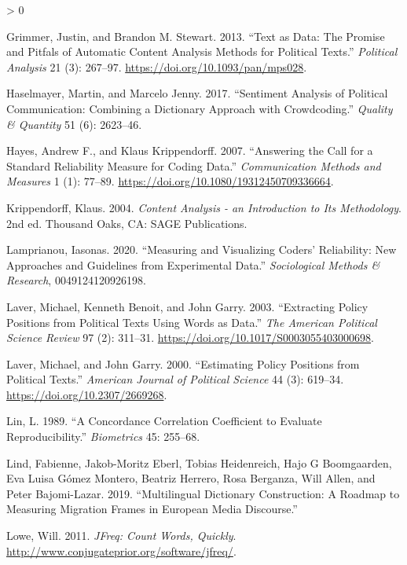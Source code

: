 \documentclass[
]{book}
\newlength{\cslhangindent}
\newenvironment{CSLReferences}[2] %
 {%
  \setlength{\parindent}{0pt}
  \ifodd #1 \everypar{\setlength{\hangindent}{\cslhangindent}}\ignorespaces\fi
  \ifnum #2 > 0
  \setlength{\parskip}{#2\baselineskip}
  \fi
 }%
 {}
\begin{document}
\begin{CSLReferences}{1}{0}
\leavevmode\hypertarget{ref-Grimmer2013a}{}%
Grimmer, Justin, and Brandon M. Stewart. 2013. {``Text as Data: The Promise and Pitfals of Automatic Content Analysis Methods for Political Texts.''} \emph{Political Analysis} 21 (3): 267--97. \url{https://doi.org/10.1093/pan/mps028}.

\leavevmode\hypertarget{ref-Haselmayer2017}{}%
Haselmayer, Martin, and Marcelo Jenny. 2017. {``Sentiment Analysis of Political Communication: Combining a Dictionary Approach with Crowdcoding.''} \emph{Quality \& Quantity} 51 (6): 2623--46.

\leavevmode\hypertarget{ref-Hayes2007a}{}%
Hayes, Andrew F., and Klaus Krippendorff. 2007. {``Answering the Call for a Standard Reliability Measure for Coding Data.''} \emph{Communication Methods and Measures} 1 (1): 77--89. \url{https://doi.org/10.1080/19312450709336664}.

\leavevmode\hypertarget{ref-Krippendorff2004a}{}%
Krippendorff, Klaus. 2004. \emph{Content Analysis - an Introduction to Its Methodology}. 2nd ed. Thousand Oaks, CA: SAGE Publications.

\leavevmode\hypertarget{ref-Lamprianou2020}{}%
Lamprianou, Iasonas. 2020. {``Measuring and Visualizing Coders' Reliability: New Approaches and Guidelines from Experimental Data.''} \emph{Sociological Methods \& Research}, 0049124120926198.

\leavevmode\hypertarget{ref-Laver2003a}{}%
Laver, Michael, Kenneth Benoit, and John Garry. 2003. {``Extracting Policy Positions from Political Texts Using Words as Data.''} \emph{The American Political Science Review} 97 (2): 311--31. \url{https://doi.org/10.1017/S0003055403000698}.

\leavevmode\hypertarget{ref-Laver2000a}{}%
Laver, Michael, and John Garry. 2000. {``Estimating Policy Positions from Political Texts.''} \emph{American Journal of Political Science} 44 (3): 619--34. \url{https://doi.org/10.2307/2669268}.

\leavevmode\hypertarget{ref-Lin1989a}{}%
Lin, L. 1989. {``A Concordance Correlation Coefficient to Evaluate Reproducibility.''} \emph{Biometrics} 45: 255--68.

\leavevmode\hypertarget{ref-Lind2019}{}%
Lind, Fabienne, Jakob-Moritz Eberl, Tobias Heidenreich, Hajo G Boomgaarden, Eva Luisa Gómez Montero, Beatriz Herrero, Rosa Berganza, Will Allen, and Peter Bajomi-Lazar. 2019. {``Multilingual Dictionary Construction: A Roadmap to Measuring Migration Frames in European Media Discourse.''}

\leavevmode\hypertarget{ref-Lowe2011b}{}%
Lowe, Will. 2011. \emph{JFreq: Count Words, Quickly}. \url{http://www.conjugateprior.org/software/jfreq/}.


\end{CSLReferences}
\end{document}
